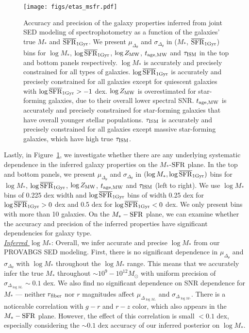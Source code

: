 \begin{figure}
\begin{center}
    \texttt{[image: figs/etas\_msfr.pdf]} 
    \caption{
        Accuracy and precision of the galaxy properties inferred from joint SED
        modeling of spectrophotometry as a function of the galaxies' true $M_*$
        and $\overline{\rm SFR}_{\rm 1Gyr}$. 
        We present $\mu_{\Delta_{\theta}}$ and $\sigma_{\Delta_{\theta}}$ in
        ($M_*$, $\overline{\rm SFR}_{\rm 1Gyr}$) bins for $\log M_*$, $\log\overline{\rm SFR}_{\rm 1Gyr}$, $\log Z_{\rm
        MW}$, $t_{\rm age, MW}$ and $\tau_{\rm ISM}$ in the top and bottom
        panels respectively. 
        $\log M_*$ is accurately and precisely constrained for all types of galaxies. 
        $\log\overline{\rm SFR}_{\rm 1Gyr}$ is accurately and precisely constrained for all galaxies
        except for quiescent galaxies with $\log\overline{\rm SFR}_{\rm 1Gyr} > -1$ dex. 
        $\log Z_{\rm MW}$ is overestimated for star-forming galaxies, due to their
        overall lower spectral SNR. 
        $t_{\rm age, MW}$ is accurately and precisely constrained for star-forming
        galaxies that have overall younger stellar populations. 
        $\tau_{\rm ISM}$ is accurately and precisely constrained for all galaxies
        except massive star-forming galaxies, which have high true $\tau_{\rm ISM}$. 
    }\label{fig:etas_msfr}
\end{center}
\end{figure}

Lastly, in Figure~\ref{fig:etas_msfr}, we investigate whether there are any
underlying systematic dependence in the inferred galaxy properties on the  
$M_*$-${\rm SFR}$ plane. 
In the top and bottom panels, we present $\mu_{\Delta_{\theta}}$ and 
$\sigma_{\Delta_{\theta}}$ in $(\log M_*, \log\overline{\rm SFR}_{\rm 1Gyr})$ bins for 
$\log M_*$, $\log\overline{\rm SFR}_{\rm 1Gyr}$, $\log Z_{\rm MW}$, $t_{\rm age, MW}$ and $\tau_{\rm ISM}$ (left to
right).
We use $\log M_*$ bins of 0.225 dex width and $\log\overline{\rm SFR}_{\rm 1Gyr}$ bins of width 
0.25 dex for $\log \overline{\rm SFR}_{\rm 1Gyr} > 0$ dex and 0.5 dex for $\log \overline{\rm SFR}_{\rm 1Gyr} < 0$ dex. 
We only present bins with more than 10 galaxies. 
On the $M_*-{\rm SFR}$ plane, we can examine whether the accuracy and precision
of the inferred properties have significant dependencies for galaxy type.\\ 

\noindent \underline{\emph{Inferred $\log M_*$}}: 
Overall, we infer accurate and precise $\log M_*$ from our {\sc PROVABGS} SED
modeling. 
First, there is no significant dependence in $\mu_{\Delta_{\theta}}$ and 
$\sigma_{\Delta_{\theta}}$ with $\log M_*$ throughout the $\log M_*$ range. 
This means that we accurately infer the true $M_*$ throughout ${\sim}10^{9} -
10^{12} M_\odot$  with uniform precision of $\sigma_{\Delta_{\log M_*}} \sim 0.1$ dex. 
We also find no significant dependence on SNR dependence for $M_*$ ---
neither $r_{\rm fiber}$ nor $r$ magnitudes affect $\mu_{\Delta_{\log M_*}}$ and 
$\sigma_{\Delta_{\log M_*}}$.
There is a noticeable correlation with $g-r$ and $r-z$ color, which also
appears in the $M_*-{\rm SFR}$ plane. 
However, the effect of this correlation is small $< 0.1$ dex, especially
considering the ${\sim}0.1$ dex accuracy of our inferred posterior on 
$\log M_*$. \\

